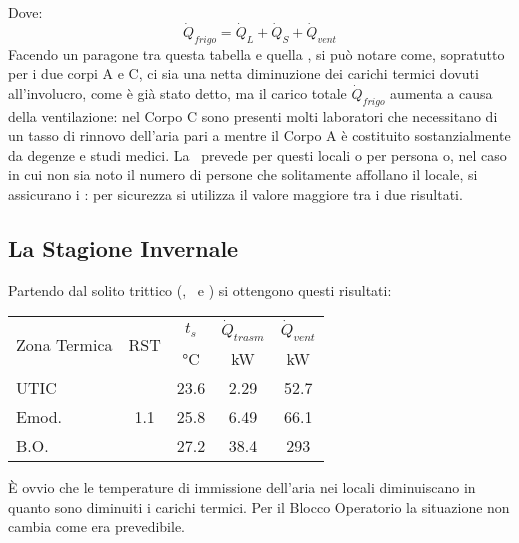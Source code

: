 Dove:
\begin{equation}
	\dot{Q}_{frigo}=\dot{Q}_L+\dot{Q}_S+\dot{Q}_{vent}
\end{equation}
Facendo un paragone tra questa tabella e quella , si può notare come, sopratutto per i due corpi A e C, ci sia una netta diminuzione dei carichi termici dovuti all'involucro, come è già stato detto, ma il carico totale $\dot{Q}_{frigo}$ aumenta a causa della ventilazione: nel Corpo C sono presenti molti laboratori che necessitano di un tasso di rinnovo dell'aria pari a  mentre il Corpo A è costituito sostanzialmente da degenze e studi medici. La \norvent\ prevede per questi locali o  per persona o, nel caso in cui non sia noto il numero di persone che solitamente affollano il locale, si assicurano i : per sicurezza si utilizza il valore maggiore tra i due risultati.

\subsection{La Stagione Invernale}
Partendo dal solito trittico (\utic, \emod\ e \blocc) si ottengono questi risultati:
\begin{center}
	\label{UTA:potenzaPROGETTO}
	\begin{tabular}{lcccc}
		\toprule
		\multirow{2}{*}{Zona Termica}				& \multirow{2}{*}{RST}	&	$t_s$ 					& $\dot{Q}_{trasm}$	&	$\dot{Q}_{vent}$	\\
							&						&	\si{\degreeCelsius} &	\si{kW}				&	\si{kW}\\
		\midrule
		UTIC			&\multirow{3}{*}{1.1}	&	\num{23.6}	&\num{2.29}		&	\num{52.7}\\
		Emod.			&						&	\num{25.8}	&\num{6.49}		&	\num{66.1}\\
		B.O.			&						&	\num{27.2}	&\num{38.4}		&	\num{293}\\
		\bottomrule
	\end{tabular}
\end{center}
È ovvio che le temperature di immissione dell'aria nei locali diminuiscano in quanto sono diminuiti i carichi termici. Per il Blocco Operatorio la situazione non cambia come era prevedibile. 

